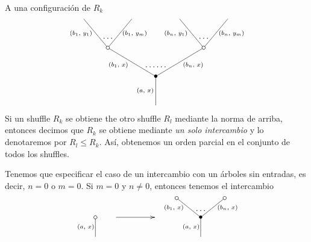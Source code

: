 \documentclass[../main.tex]{subfiles}
\begin{document}
A una configuraci\'on de $R_k$
\begin{equation}
    \xy
    <0.08cm, 0cm>:
    (0.0, 0.0)*{}="1"; %
    (0.0, 15.0)*=0{\bullet}="2"; %
    (-25.0, 30.0)*\cir<2pt>{}="3"; %
    (-37.5, 45.0)*{}="4"; %
    (-12.5, 45.0)*{}="5"; %
    (25.0, 30.0)*\cir<2pt>{}="6"; %
    (12.5, 45.0)*{}="7"; %
    (37.5, 45.0)*{}="8"; %
    "1";"2" **\dir{-};
    "2";"3" **\dir{-};
    "3";"4" **\dir{-};
    "3";"5" **\dir{-};
    "2";"6" **\dir{-};
    "6";"7" **\dir{-};
    "6";"8" **\dir{-};
    (-5.5, 7.5)*=0{\scriptstyle (a,\text{ }x)};
    (-19.5, 21)*=0{\scriptstyle (b_1,\text{ }x)};
    (-39, 37.5)*=0{\scriptstyle (b_1,\text{ }y_1)};
    (-11, 37.5)*=0{\scriptstyle (b_1,\text{ }y_m)};
    (19.5, 21)*=0{\scriptstyle (b_n,\text{ }x)};
    (10.5, 37.5)*=0{\scriptstyle (b_n,\text{ }y_1)};
    (39.5, 37.5)*=0{\scriptstyle (b_n,\text{ }y_m)};
    (-25,35)*{\dots};
    (25,35)*{\dots};
    (0,20)*{\dots\dots};
    \endxy
\end{equation}
Si un shuffle $R_k$ se obtiene the otro shuffle $R_l$ mediante la norma de arriba, entonces decimos que $R_k$ se obtiene mediante \emph{un solo intercambio} y lo denotaremos por $R_l\le R_k$.
As\'i, obtenemos un orden parcial en el conjunto de todos los shuffles.

Tenemos que especificar el caso de un intercambio con un \'arboles sin entradas, es decir, $n=0$ o $m=0$. Si $m=0$ y $n\ne 0$, entonces tenemos el intercambio
\begin{equation}
    \xy
    <0.08cm, 0cm>:
    (0.0, 0.0)*{}="1"; %
    (0.0, 10.0)*\cir<2pt>{}="2"; %
    "1";"2" **\dir{-};
    (-5.0, 5.0)*=0{\scriptstyle (a,\text{ }x)};
    \endxy
    \xy
    <0.08cm, 0cm>:
    (-20, 0.0)*{}="1";
    (20, 10.0)*{}="2";
    {\ar(-10, 10)*{};(10,10)*{}};
    \endxy
    \xy
    <0.08cm, 0cm>:
    (0.0, 0.0)*{}="1"; %
    (0.0, 10.0)*=0{\bullet}="2"; %
    (-12.5, 20.0)*\cir<2pt>{}="3"; %
    (12.5, 20.0)*\cir<2pt>{}="4"; %
    "1";"2" **\dir{-};
    "2";"3" **\dir{-};
    "2";"4" **\dir{-};
    (-5.0, 5.0)*=0{\scriptstyle (a,\text{ }x)};
    (-14, 15.0)*=0{\scriptstyle (b_1,\text{ }x)};
    (14, 15.0)*=0{\scriptstyle (b_n,\text{ }x)};
    (0,13.5)*{\dots};
    \endxy
\end{equation}
\end{document}
